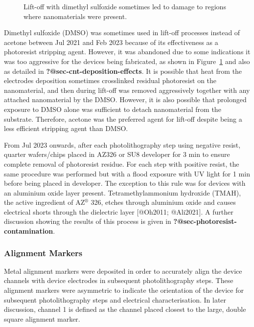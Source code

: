 \documentclass[
  letterpaper,
  DIV=11,
  numbers=noendperiod]{scrartcl}
\begin{document}
\begin{figure}
\begin{minipage}[t]{0.47\linewidth}
{{}

}

\end{minipage}%

\caption{\label{fig-dmso-damage}Lift-off with dimethyl sulfoxide
sometimes led to damage to regions where nanomaterials were present.}

\end{figure}

Dimethyl sulfoxide (DMSO) was sometimes used in lift-off processes
instead of acetone between Jul 2021 and Feb 2023 because of its
effectiveness as a photoresist stripping agent. However, it was
abandoned due to some indications it was too aggressive for the devices
being fabricated, as shown in Figure~\ref{fig-dmso-damage} and also as
detailed in \textbf{?@sec-cnt-deposition-effects}. It is possible that
heat from the electrodes deposition sometimes crosslinked residual
photoresist on the nanomaterial, and then during lift-off was removed
aggressively together with any attached nanomaterial by the DMSO.
However, it is also possible that prolonged exposure to DMSO alone was
sufficient to detach nanomaterial from the substrate. Therefore, acetone
was the preferred agent for lift-off despite being a less efficient
stripping agent than DMSO.

From Jul 2023 onwards, after each photolithography step using negative
resist, quarter wafers/chips placed in AZ326 or SU8 developer for 3 min
to ensure complete removal of photoresist residue. For each step with
positive resist, the same procedure was performed but with a flood
exposure with UV light for 1 min before being placed in developer. The
exception to this rule was for devices with an aluminium oxide layer
present. Tetramethylammonium hydroxide (TMAH), the active ingredient of
AZ\(^\circledR\) 326, etches through aluminium oxide and causes
electrical shorts through the dielectric layer {[}@Oh2011; @Ali2021{]}.
A further discussion showing the results of this process is given in
\textbf{?@sec-photoresist-contamination}.

\hypertarget{sec-align}{%
\subsubsection{Alignment Markers}\label{sec-align}}

Metal alignment markers were deposited in order to accurately align the
device channels with device electrodes in subsequent photolithography
steps. These alignment markers were asymmetric to indicate the
orientation of the device for subsequent photolithography steps and
electrical characterisation. In later discussion, channel 1 is defined
as the channel placed closest to the large, double square alignment
marker.
\end{document}
